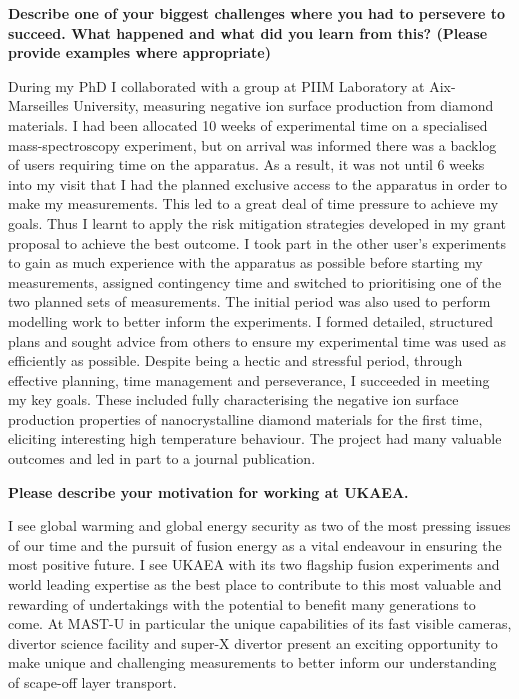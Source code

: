 \documentclass[11pt,a4paper,sans]{moderncv}        %
\begin{document}
\textbf{Describe one of your biggest challenges where you had to persevere to succeed. What happened and what did you learn from this? (Please provide examples where appropriate)} 

During my PhD I collaborated with a group at PIIM Laboratory at Aix-Marseilles University, measuring negative ion surface production from diamond materials. I had been allocated 10 weeks of experimental time on a specialised mass-spectroscopy experiment, but on arrival was informed there was a backlog of users requiring time on the apparatus. As a result, it was not until 6 weeks into my visit that I had the planned exclusive access to the apparatus in order to make my measurements. This led to a great deal of time pressure to achieve my goals. Thus I learnt to apply the risk mitigation strategies developed in my grant proposal to achieve the best outcome. I took part in the other user's experiments to gain as much experience with the apparatus as possible before starting my measurements, assigned contingency time and switched to prioritising one of the two planned sets of measurements. The initial period was also used to perform modelling work to better inform the experiments. I formed detailed, structured plans and sought advice from others to ensure my experimental time was used as efficiently as possible. Despite being a hectic and stressful period, through effective planning, time management and perseverance, I succeeded in meeting my key goals. These included fully characterising the negative ion surface production properties of nanocrystalline diamond materials for the first time, eliciting interesting high temperature behaviour. The project had many valuable outcomes and led in part to a journal publication.

\textbf{Please describe your motivation for working at UKAEA.}

I see global warming and global energy security as two of the most pressing issues of our time and the pursuit of fusion energy as a vital endeavour in ensuring the most positive future. I see UKAEA with its two flagship fusion experiments and world leading expertise as the best place to contribute to this most valuable and rewarding of undertakings with the potential to benefit many generations to come. At MAST-U in particular the unique capabilities of its fast visible cameras, divertor science facility and super-X divertor present an exciting opportunity to make unique and challenging measurements to better inform our understanding of scape-off layer transport.


\end{document}

